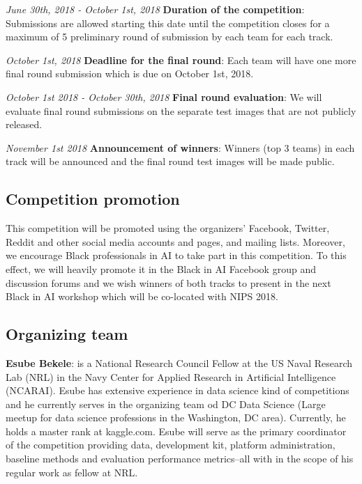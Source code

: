 \documentclass[11pt, oneside]{article}
\begin{document}
{\it June 30th, 2018 - October 1st, 2018} {\bf Duration of the competition}: 
Submissions are allowed starting this date until the competition closes for a 
maximum of 5 preliminary round of submission by each team for each track.

{\it October 1st, 2018} {\bf Deadline for the final round}: Each team will have 
one more final round submission which is due on October 1st, 2018.

{\it October 1st 2018 - October 30th, 2018} {\bf Final round evaluation}: We 
will evaluate final round submissions on the separate test images that are not 
publicly released.

{\it November 1st 2018} {\bf Announcement of winners}: Winners (top 3 teams) in 
each track will be announced and the final round test images will be made 
public.

\subsection{Competition promotion}

This competition will be promoted using the organizers' Facebook, Twitter, 
Reddit and other social media accounts and pages, and mailing lists. Moreover, 
we encourage Black professionals in AI to take part in this competition. To 
this effect, we will heavily promote it in the Black in AI Facebook group and 
discussion forums and we wish winners of both tracks to present in the next 
Black in AI workshop which will be co-located with NIPS 2018.

\subsection{Organizing team}

{\bf Esube Bekele}: is a National Research Council Fellow at the US Naval
Research Lab (NRL) in the Navy Center for Applied Research in Artificial
Intelligence (NCARAI). Esube has extensive experience in data science kind of
competitions and he currently serves in the organizing team od DC Data Science
(Large meetup for data science professions in the Washington, DC area).
Currently, he holds a master rank at kaggle.com. Esube will serve as the
primary coordinator of the competition providing data, development kit,
platform administration, baseline methods and evaluation performance
metrics--all with in the scope of his regular work as fellow at NRL.
\end{document}
